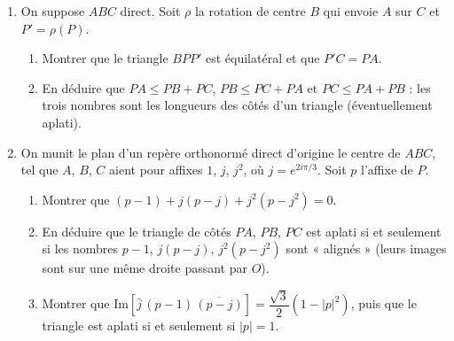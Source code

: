 \begin{enumerate}
  \item On suppose $ABC$ direct. Soit $\rho$ la rotation de centre $B$ qui envoie $A$ sur $C$ et $P'=\rho(P)$.
  \begin{enumerate}
    \item Montrer que le triangle $BPP'$ est équilatéral et que $P'C=PA$.
    \item En déduire que $PA\leq PB+PC$, $PB\leq PC+PA$ et $PC\leq PA+PB$ : les trois nombres sont les longueurs des côtés d'un triangle (éventuellement aplati).
  \end{enumerate}
  \item On munit le plan d'un repère orthonormé direct d'origine le centre de $ABC$, tel que $A$, $B$, $C$ aient pour affixes $1$, $j$, $j^2$, où $j=e^{2i\pi/3}$. Soit $p$ l'affixe de $P$.
  \begin{enumerate}
    \item Montrer que $(p-1)+j(p-j)+j^2(p-j^2)=0$.
    \item En déduire que le triangle de côtés $PA$, $PB$, $PC$ est aplati si et seulement si les nombres $p-1$, $j(p-j)$, $j^2(p-j^2)$ sont « alignés » (leurs images sont sur une même droite passant par $O$).
    \item Montrer que $\mathrm{Im}\left[\bar j\,(p-1)\,\overline{(p-j)}\right]=\dfrac{\sqrt3}{2}\left(1-|p|^2\right)$, puis que le triangle est aplati si et seulement si $|p|=1$.
  \end{enumerate}
\end{enumerate}

